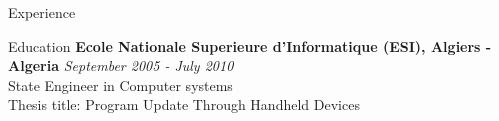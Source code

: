 \documentclass{resume} %
\begin{document}
\begin{rSection}{Experience}
\begin{rSection}{Education}
{\bf Ecole Nationale Superieure d'Informatique (ESI), Algiers - Algeria} \hfill {\em September 2005 - July 2010} \\ 
State Engineer in Computer systems\\
Thesis title: Program Update Through Handheld Devices 
\end{rSection}






\end{rSection}

\end{document}
